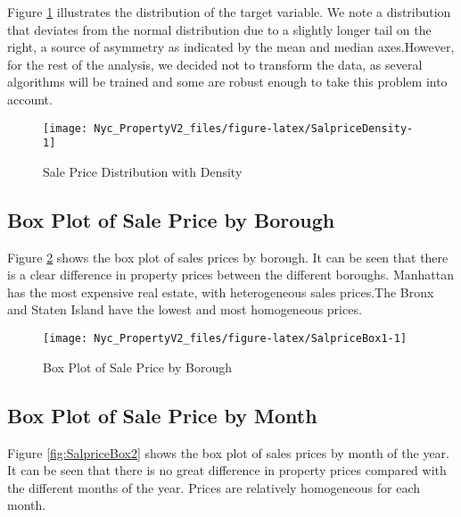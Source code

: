 \documentclass[
]{article}
\begin{document}
Figure \ref{fig:SalpriceDensity} illustrates the distribution of the target variable. We note a distribution that deviates from the normal distribution due to a slightly longer tail on the right, a source of asymmetry as indicated by the mean and median axes.However, for the rest of the analysis, we decided not to transform the data, as several algorithms will be trained and some are robust enough to take this problem into account.

\begin{figure}[H]

{\centering \texttt{[image: Nyc\_PropertyV2\_files/figure-latex/SalpriceDensity-1]} 

}

\caption{Sale Price Distribution with Density}\label{fig:SalpriceDensity}
\end{figure}

\subsection{Box Plot of Sale Price by Borough}\label{box-plot-of-sale-price-by-borough}

Figure \ref{fig:SalpriceBox1} shows the box plot of sales prices by borough. It can be seen that there is a clear difference in property prices between the different boroughs. Manhattan has the most expensive real estate, with heterogeneous sales prices.The Bronx and Staten Island have the lowest and most homogeneous prices.

\begin{figure}[H]

{\centering \texttt{[image: Nyc\_PropertyV2\_files/figure-latex/SalpriceBox1-1]} 

}

\caption{Box Plot of Sale Price by Borough}\label{fig:SalpriceBox1}
\end{figure}

\subsection{Box Plot of Sale Price by Month}\label{box-plot-of-sale-price-by-month}

Figure \ref{fig:SalpriceBox2} shows the box plot of sales prices by month of the year. It can be seen that there is no great difference in property prices compared with the different months of the year. Prices are relatively homogeneous for each month.
\end{document}
